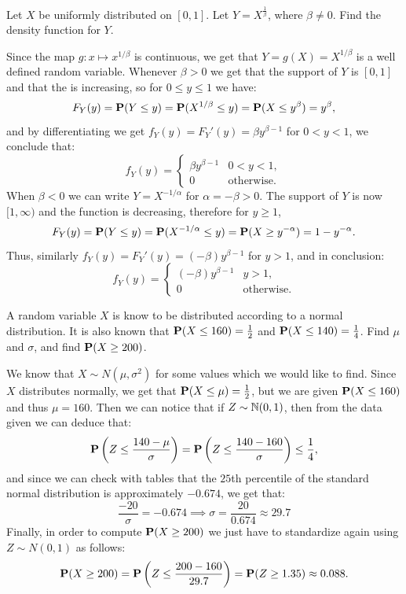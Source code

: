 \documentclass[11pt,a4paper]{article}
\begin{document}
\begin{exercise}
  Let $X$ be uniformly distributed on $[0,1]$.
  Let $Y = X^{\frac{1}{\beta}}$, where $\beta \neq 0$.
  Find the density function for $Y$.
\end{exercise}
\begin{solution}
  Since the map $g \colon x \mapsto x^{1/\beta}$ is continuous,
  we get that $Y = g(X) = X^{1/\beta}$ is a well defined random variable.
  Whenever $\beta > 0$ we get that the support of $Y$ is $[0,1]$ and
  that the is increasing, so for $0 \le y \le 1$ we have:
  \[
    F_Y(y) =
    \mathbf{P}(Y \le y) =
    \mathbf{P}(X^{1/\beta} \le y) =
    \mathbf{P}(X \le y^{\beta}) = y^{\beta},
  \]
  and by differentiating we get $f_Y(y) = F_Y'(y) = \beta y^{\beta - 1}$
  for $0 < y < 1$, we conclude that:
  \[
    f_Y(y) =
    \begin{cases}
      \beta y^{\beta - 1} &0 < y < 1, \\
      0 &\text{otherwise}.
    \end{cases}
  \]
  When $\beta < 0$ we can write $Y = X^{-1/\alpha}$ for $\alpha = -\beta > 0$.
  The support of $Y$ is now $[1,\infty)$ and the function is decreasing,
  therefore for $y \geq 1$,
  \[
    F_Y(y) =
    \mathbf{P}(Y \le y) =
    \mathbf{P}(X^{-1/\alpha} \le y) =
    \mathbf{P}(X \geq y^{-\alpha}) = 1 - y^{-\alpha}.
  \]
  Thus, similarly $f_Y(y) = F_Y'(y) = (-\beta) y^{\beta - 1}$ for $y > 1$,
  and in conclusion:
  \[
    f_Y(y) =
    \begin{cases}
      (-\beta) y^{\beta - 1} &y > 1, \\
      0 &\text{otherwise}.
    \end{cases}
  \]
\end{solution}

\begin{exercise}
  A random variable $X$ is know to be distributed according to a normal distribution.
  It is also known that $\mathbf{P}(X \le 160) = \frac{1}{2}$ and $\mathbf{P}(X \le 140) = \frac{1}{4}$.
  Find $\mu$ and $\sigma$, and find $\mathbf{P}(X \geq 200)$.
\end{exercise}
\begin{solution}
  We know that $X \sim N(\mu,\sigma^2)$ for some values which we would like to find.
  Since $X$ distributes normally, we get that $\mathbf{P}(X \le \mu) = \frac{1}{2}$,
  but we are given $\mathbf{P}(X \le 160)$ and thus $\mu = 160$.
  Then we can notice that if $Z \sim \mathbb{N}(0,1)$,
  then from the data given we can deduce that:
  \[
    \Prob\del{Z \le \frac{140 - \mu}{\sigma}} =
    \Prob\del{Z \le \frac{140 - 160}{\sigma}}
    \le \frac{1}{4},
  \]
  and since we can check with tables that the $25$th percentile of the
  standard normal distribution is approximately $-0.674$, we get that:
  \[
    \frac{-20}{\sigma} = -0.674 \implies
    \sigma = \frac{20}{0.674} \approx 29.7
  \]
  Finally, in order to compute $\mathbf{P}(X \geq 200)$ we just have to standardize
  again using $Z \sim N(0,1)$ as follows:
  \[
    \Prob(X \geq 200) =
    \Prob\del{Z \le \frac{200 - 160}{29.7}} =
    \Prob(Z \geq 1.35) \approx 0.088.
  \]
\end{solution}
\end{document}
